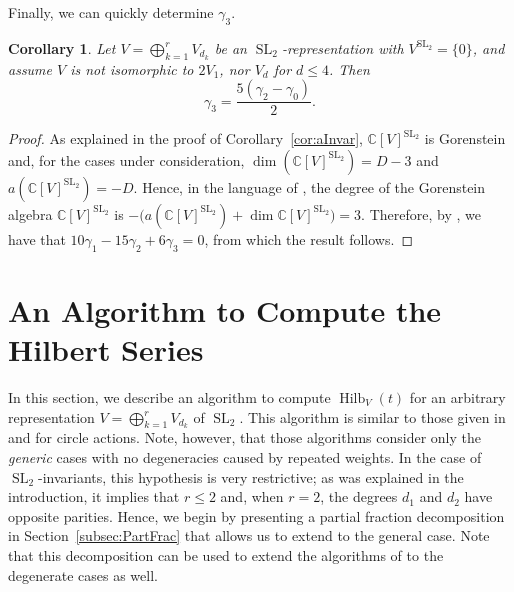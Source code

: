 \documentclass{amsart}
\newtheorem{corollary}[theorem]{Corollary}
\theoremstyle{definition}
\theoremstyle{remark}
\newcommand{\C}{\mathbb{C}}
\newcommand{\SL}{\operatorname{SL}}
\newcommand{\Hilb}{\operatorname{Hilb}}
\begin{document}
Finally, we can quickly determine $\gamma_3$.

\begin{corollary}
\label{cor:Gamma3Schur}
Let $V = \bigoplus_{k=1}^r V_{d_k}$ be an $\SL_2$-representation with $V^{\SL_2} = \{0\}$,
and assume $V$ is not isomorphic to $2V_1$, nor $V_d$ for $d \leq 4$. Then
\begin{equation}
\label{eq:Gamma3Schur}
    \gamma_3 = \frac{5(\gamma_2 - \gamma_0)}{2}.
\end{equation}
\end{corollary}
\begin{proof}
As explained in the proof of Corollary~\ref{cor:aInvar}, $\C[V]^{\SL_2}$
is Gorenstein and, for the cases under consideration, $\dim(\C[V]^{\SL_2}) = D - 3$
and $a(\C[V]^{\SL_2}) = -D$. Hence, in the language of \cite{HerbigHerdenSeaton2},
the degree of the Gorenstein algebra
$\C[V]^{\SL_2}$ is $-\big( a(\C[V]^{\SL_2}) + \dim \C[V]^{\SL_2} \big) = 3$.
Therefore, by \cite[Theorem 1, Equation (1.6)]{HerbigHerdenSeaton2}, we have that
$10\gamma_1 - 15\gamma_2 + 6\gamma_3 = 0$, from which the result follows.
\end{proof}


\section{An Algorithm to Compute the Hilbert Series}
\label{sec:Algorithm}

In this section, we describe an algorithm to compute $\Hilb_V(t)$ for an arbitrary representation
$V = \bigoplus_{k=1}^r V_{d_k}$ of $\SL_2$.
This algorithm is similar to those given in \cite[Section 4]{HerbigSeaton} and
\cite[Section 4]{CowieHerbigSeatonHerden} for circle actions. Note, however, that those
algorithms consider only the \emph{generic} cases with no degeneracies caused by repeated weights.
In the case of $\SL_2$-invariants, this hypothesis is very restrictive; as was explained in
the introduction, it implies that $r \leq 2$ and, when $r = 2$, the degrees $d_1$ and $d_2$
have opposite parities. Hence, we begin by presenting a partial fraction decomposition in
Section~\ref{subsec:PartFrac} that allows us to extend to the general case. Note that this
decomposition can be used to extend the algorithms of \cite{CowieHerbigSeatonHerden,HerbigHerdenSeaton}
to the degenerate cases as well.
\end{document}
